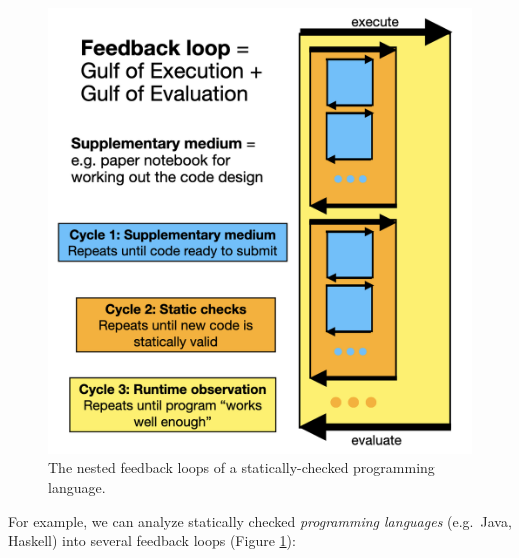 \documentclass[english,submission]{programming}
\begin{document}
\begin{figure}
  \centering
  \includegraphics[width=0.5\linewidth]{feedback-loops.png}
  \caption{The nested feedback loops of a statically-checked programming language.\label{fig:feedback-loops}}
\end{figure}

For example, we can analyze statically checked \emph{programming
languages} (e.g.~Java, Haskell) into several feedback loops (Figure
\ref{fig:feedback-loops}):
\end{document}
